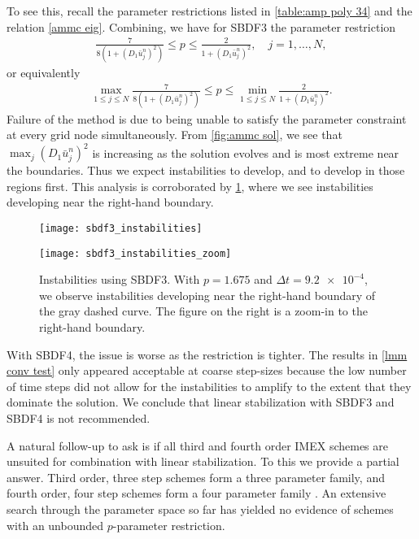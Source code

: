 To see this, recall the parameter restrictions listed in \cref{table:amp poly 34} and the relation \cref{ammc eig}. Combining, we have for SBDF3 the parameter restriction
\begin{align}
        \frac{7}{8(1 + (D_1\bar u^n_j)^2)} \leq p \leq \frac{2}{1 + (D_1 \bar u^n_j)^2},
\quad j=1,\dots,N,
\end{align}
or equivalently
\begin{align} 
\max_{1\leq j\leq N}\frac{7}{8(1 + (D_1\bar u^n_j)^2)} \leq p 
\leq \min_{1\leq j\leq N}\frac{2}{1 + (D_1 \bar u^n_j)^2}.
\end{align}
Failure of the method is due to being unable to satisfy the parameter constraint at every grid node simultaneously. From \cref{fig:ammc sol}, we see that $\max_j (D_1 \bar u^n_j)^2$ is increasing as the solution evolves and is most extreme near the boundaries. Thus we expect instabilities to develop, and to develop in those regions first. This analysis is corroborated by \cref{fig:sbdf3 instab}, where we see instabilities developing near the right-hand boundary.
\begin{figure}[htb!]
        \centering
\begin{minipage}{0.45\textwidth}
       \texttt{[image: sbdf3\_instabilities]}
\end{minipage}
\begin{minipage}{0.45\textwidth}
       \texttt{[image: sbdf3\_instabilities\_zoom]}
\end{minipage}
\caption[Instabilities using SBDF3.]{Instabilities using SBDF3. With $p=1.675$ and $\Delta t=\num{9.2e-4}$, we observe instabilities developing near the right-hand boundary of the gray dashed curve. The figure on the right is a zoom-in to the right-hand boundary.}
\label{fig:sbdf3 instab}
\end{figure}

With SBDF4, the issue is worse as the restriction is tighter. The results in \cref{lmm conv test} only appeared acceptable at coarse step-sizes because the low number of time steps did not allow for the instabilities to amplify to the extent that they dominate the solution. We conclude that linear stabilization with SBDF3 and SBDF4  is not recommended. 

A natural follow-up to ask is if all third and fourth order IMEX schemes are unsuited for combination with linear stabilization. To this we provide a partial answer. Third order, three step schemes form a three parameter family, and fourth order, four step schemes form a four parameter family \cite{ascher1995implicit}. An extensive search through the parameter space so far has yielded no evidence of schemes with an unbounded $p$-parameter restriction.

